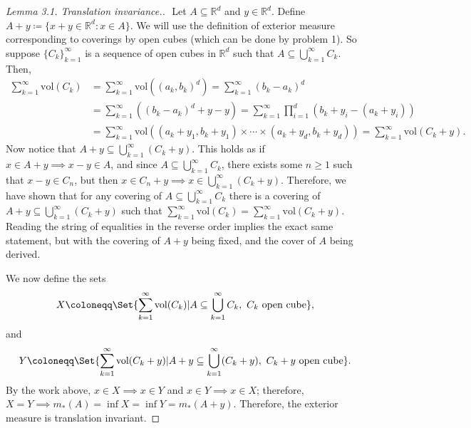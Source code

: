 \begin{proof}[Lemma 3.1. Translation invariance.]$ $\newline
Let \( A \subseteq \mathbb{R}^{d}  \) and \( y \in \mathbb{R}^{d}  \). Define \( A + y \coloneqq \{ x + y \in \mathbb{R}^{d} : x \in A \}. \) We will use the definition of exterior measure corresponding to coverings by open cubes (which can be done by problem 1). So suppose \( \{ C_k \}_{k=1}^{\infty}  \) is a sequence of open cubes in \( \mathbb{R}^{d}  \) such that \( A \subseteq \bigcup_{k=1}^{\infty} C_k \). Then,
\begin{align*}
	\sum_{k=1}^{\infty} \mbox{vol}(C_k)  &= \sum_{k=1}^{\infty} \mbox{vol}((a_k , b_k)^{d} ) = \sum_{k=1}^{\infty}(b_k - a_k)^{d} \\ 
					     &= \sum_{k=1}^{\infty}((b_k - a_k)^{d} + y - y) =\sum_{k=1}^{\infty}\prod_{i=1} ^{d} (b_k + y_i - (a_k + y_i)) \\ 
					     &= \sum_{k=1}^{\infty} \mbox{vol}\left ( {(a_k + y_1, b_k + y_1) \times \cdots \times (a_k + y_d, b_k + y_d)   } \right ) = \sum_{k=1}^{\infty}\mbox{vol}(C_k + y).
\end{align*}
Now notice that \( A+y \subseteq \bigcup_{k=1}^{\infty} (C_k + y) \). This holds as if \( x \in A+y \implies x - y \in A\), and since \( A \subseteq \bigcup_{k=1}^{\infty} C_k \), there exists some \( n \geq 1 \) such that \( x - y \in C_n \), but then \( x \in C_n + y \implies x \in \bigcup_{k=1}^{\infty} (C_k + y) .\) Therefore, we have shown that for any covering of \( A \subseteq \bigcup_{k=1}^{\infty} C_k \) there is a covering of \( A+y \subseteq \bigcup_{k=1}^{\infty} (C_k + y) \) such that \(\sum_{k=1}^{\infty}\mbox{vol}(C_k)  = \sum_{k=1}^{\infty}\mbox{vol}(C_k+y) \). Reading the string of equalities in the reverse order implies the exact same statement, but with the covering of \( A+y \) being fixed, and the cover of \( A \) being derived.

We now define the sets \[X \coloneqq \Set{\sum_{k=1}^{\infty} \mbox{vol}(C_k) | A \subseteq \bigcup_{k=1}^{\infty} C_k , \ C_k \mbox{ open cube} },\] and \[Y \coloneqq \Set{\sum_{k=1}^{\infty} \mbox{vol}(C_k + y) | A + y\subseteq \bigcup_{k=1}^{\infty} (C_k+y) , \ C_k + y \mbox{ open cube} }. \] By the work above, \( x \in X \implies x \in Y \) and \( x \in Y \implies x \in X \); therefore, \( X = Y \implies m_*(A) = \inf X = \inf Y = m_*(A+y).\) Therefore, the exterior measure is translation invariant. 
\end{proof}

